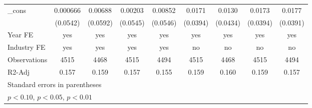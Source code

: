 {\begin{tabular}{l*{8}{c}}
\_cons              &    0.000666         &     0.00688         &     0.00203         &     0.00852         &      0.0171         &      0.0130         &      0.0173         &      0.0177         \\
                    &    (0.0542)         &    (0.0592)         &    (0.0545)         &    (0.0546)         &    (0.0394)         &    (0.0434)         &    (0.0394)         &    (0.0391)         \\
\hline
Year FE             &         yes         &         yes         &         yes         &         yes         &         yes         &         yes         &         yes         &         yes         \\
Industry FE         &         yes         &         yes         &         yes         &         yes         &          no         &          no         &          no         &          no         \\
Observations        &        4515         &        4468         &        4515         &        4494         &        4515         &        4468         &        4515         &        4494         \\
R2-Adj              &       0.157         &       0.159         &       0.157         &       0.155         &       0.159         &       0.160         &       0.159         &       0.157         \\
\hline\hline
\multicolumn{9}{l}{\footnotesize Standard errors in parentheses}\\
\multicolumn{9}{l}{\footnotesize \sym{*} \(p<0.10\), \sym{**} \(p<0.05\), \sym{***} \(p<0.01\)}\\
\end{tabular}
}

